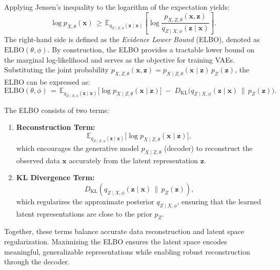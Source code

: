 Applying Jensen's inequality to the logarithm of the expectation yields:
\[
\log p_{X,\theta}(\mathbf{x}) 
\,\geq\,
\mathbb{E}_{q_{Z \mid X,\phi}(\mathbf{z} \mid \mathbf{x})} 
\left[
\log \frac{p_{X,Z,\theta}(\mathbf{x}, \mathbf{z})}{q_{Z \mid X,\phi}(\mathbf{z} \mid \mathbf{x})}
\right].
\]
The right-hand side is defined as the \emph{Evidence Lower Bound} (ELBO), denoted as \(\mathrm{ELBO}(\theta, \phi)\). By construction, the ELBO provides a tractable lower bound on the marginal log-likelihood and serves as the objective for training VAEs. Substituting the joint probability \(p_{X,Z,\theta}(\mathbf{x}, \mathbf{z}) = p_{X \mid Z,\theta}(\mathbf{x} \mid \mathbf{z}) \, p_Z(\mathbf{z})\), the ELBO can be expressed as:
\[
\mathrm{ELBO}(\theta, \phi) 
\,=\,
\mathbb{E}_{q_{Z \mid X,\phi}(\mathbf{z} \mid \mathbf{x})}
\big[
\log p_{X \mid Z,\theta}(\mathbf{x} \mid \mathbf{z})
\big]
\;-\;
D_{\mathrm{KL}}
\big(q_{Z \mid X,\phi}(\mathbf{z} \mid \mathbf{x}) \,\|\, p_Z(\mathbf{z})\big).
\]

\noindent The ELBO consists of two terms:
\begin{enumerate}
    \item \textbf{Reconstruction Term:}  
    \[
    \mathbb{E}_{q_{Z \mid X,\phi}(\mathbf{z} \mid \mathbf{x})} 
    \big[\log p_{X \mid Z,\theta}(\mathbf{x} \mid \mathbf{z})\big],
    \]
    which encourages the generative model \(p_{X \mid Z,\theta}\) (decoder) to reconstruct the observed data \(\mathbf{x}\) accurately from the latent representation \(\mathbf{z}\).
    \item \textbf{KL Divergence Term:}  
    \[
    D_{\mathrm{KL}}(q_{Z \mid X,\phi}(\mathbf{z} \mid \mathbf{x}) \,\|\, p_Z(\mathbf{z})),
    \]
    which regularizes the approximate posterior \(q_{Z \mid X,\phi}\), ensuring that the learned latent representations are close to the prior \(p_Z\).
\end{enumerate}

Together, these terms balance accurate data reconstruction and latent space regularization. Maximizing the ELBO ensures the latent space encodes meaningful, generalizable representations while enabling robust reconstruction through the decoder.


